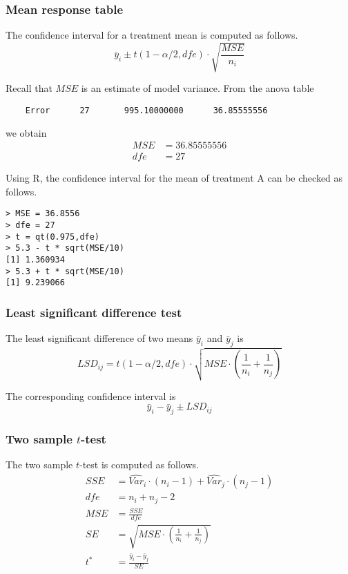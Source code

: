 \documentclass[12pt]{article}
\begin{document}
\subsubsection*{Mean response table}

The confidence interval for a treatment mean is computed as follows.
\[
\bar y_i\pm t(1-\alpha/2,dfe)\cdot\sqrt{\frac{MSE}{n_i}}
\]

Recall that $MSE$ is an estimate of model variance.
From the anova table

{\footnotesize\begin{verbatim}
    Error      27       995.10000000      36.85555556
\end{verbatim}}

we obtain
\begin{align*}
MSE&=36.85555556\\
dfe&=27
\end{align*}

Using R, the confidence interval for the mean of treatment A can be
checked as follows.

{\footnotesize\begin{verbatim}
> MSE = 36.8556
> dfe = 27
> t = qt(0.975,dfe)
> 5.3 - t * sqrt(MSE/10)
[1] 1.360934
> 5.3 + t * sqrt(MSE/10)
[1] 9.239066
\end{verbatim}}

\subsubsection*{Least significant difference test}

The least significant difference of two means
$\bar y_i$ and $\bar y_j$ is
\[
LSD_{ij}=t(1-\alpha/2,dfe)\cdot\sqrt{MSE\cdot
\left(\frac{1}{n_i}+\frac{1}{n_j}\right)}
\]

The corresponding confidence interval is
\[
\bar y_i-\bar y_j\pm LSD_{ij}
\]

\subsubsection*{Two sample $t$-test}

The two sample $t$-test is computed as follows.
\begin{align*}
SSE&=\widehat{Var}_i\cdot(n_i-1)+\widehat{Var}_j\cdot(n_j-1)\\
dfe&=n_i+n_j-2\\
MSE&=\frac{SSE}{dfe}\\
SE&=\sqrt{MSE\cdot\left(\frac{1}{n_i}+\frac{1}{n_j}\right)}\\
t^*&=\frac{\bar y_i-\bar y_j}{SE}
\end{align*}
\end{document}
